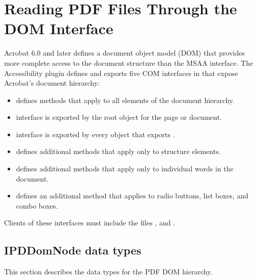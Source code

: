 \documentclass[letterpaper,12pt,english,openany,oneside]{sphinxmanual}
\begin{document}
\chapter{Reading PDF Files Through the DOM Interface}
\label{\detokenize{Access_DOM:reading-pdf-files-through-the-dom-interface}}\label{\detokenize{Access_DOM::doc}}
Acrobat 6.0 and later defines a document object model (DOM) that provides more complete access to the document structure than the MSAA interface. The Accessibility plug\sphinxhyphen{}in defines and exports five COM interfaces in  that expose Acrobat’s document hierarchy:
\begin{itemize}
\item {} 
 defines methods that apply to all elements of the document hierarchy.

\item {} 
 interface is exported by the root object for the page or document.

\item {} 
 interface is exported by every object that exports  .

\item {} 
 defines additional methods that apply only to structure elements.

\item {} 
 defines additional methods that apply only to individual words in the document.

\item {} 
 defines an additional method that applies to radio buttons, list boxes, and combo boxes.

\end{itemize}

Clients of these interfaces must include the files  ,  and  .




\section{IPDDomNode data types}
\label{\detokenize{Access_DOM:ipddomnode-data-types}}
This section describes the data types for the PDF DOM hierarchy.
\end{document}
